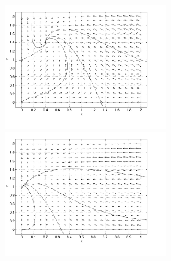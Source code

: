 \documentclass{ximera}
\begin{document}
\begin{exercise}
\begin{solution}
\begin{figure}[htb]
                       \centerline{%
                       \includegraphics[width=2.75in]{exfigure/9-1-1a.pdf}
                       \includegraphics[width=2.75in]{exfigure/9-1-1b.pdf}}
\end{figure}

\end{solution}
\end{exercise}
\end{document}
